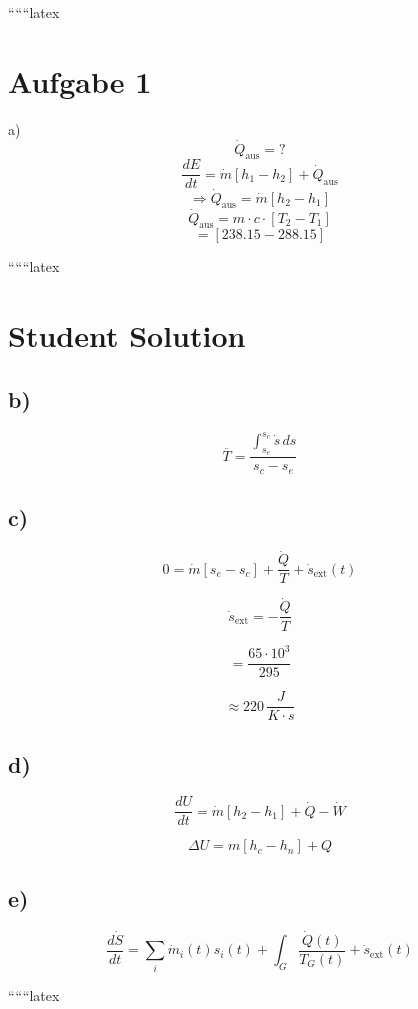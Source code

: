 
``````latex


\section*{Aufgabe 1}

a) \\
\[
\dot{Q}_{\text{aus}} = ?
\]
\[
\frac{dE}{dt} = \dot{m} \left[ h_1 - h_2 \right] + \dot{Q}_{\text{aus}}
\]
\[
\Rightarrow \dot{Q}_{\text{aus}} = \dot{m} \left[ h_2 - h_1 \right]
\]
\[
\dot{Q}_{\text{aus}} = m \cdot c \cdot \left[ T_2 - T_1 \right]
\]
\[
= \left[ 238.15 - 288.15 \right]
\]

``````latex


\section*{Student Solution}

\subsection*{b)}

\[
\overline{T} = \frac{\int_{s_e}^{s_c} \dot{s} \, ds}{s_c - s_e}
\]

\subsection*{c)}

\[
0 = \dot{m} \left[ s_e - s_c \right] + \frac{\dot{Q}}{T} + \dot{s}_{\text{ext}}(t)
\]

\[
\dot{s}_{\text{ext}} = -\frac{\dot{Q}}{T}
\]

\[
= \frac{65 \cdot 10^3}{295}
\]

\[
\approx 220 \, \frac{J}{K \cdot s}
\]

\subsection*{d)}

\[
\frac{dU}{dt} = \dot{m} \left[ h_2 - h_1 \right] + \dot{Q} - \dot{W}
\]

\[
\Delta U = m \left[ h_c - h_n \right] + Q
\]

\subsection*{e)}

\[
\frac{d\dot{S}}{dt} = \sum_i \dot{m}_i (t) s_i (t) + \int_{G} \frac{\dot{Q}(t)}{T_G (t)} + \dot{s}_{\text{ext}}(t)
\]

``````latex


